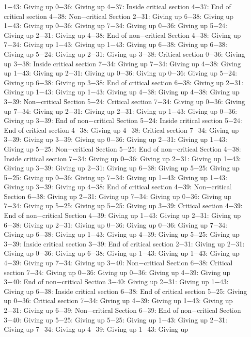 1−43: Giving up
0−36: Giving up
4−37: Inside critical section
4−37: End of critical section
4−38: Non−critical Section
2−31: Giving up
6−38: Giving up
1−43: Giving up
0−36: Giving up
7−34: Giving up
0−36: Giving up
5−24: Giving up
2−31: Giving up
4−38: End of non−critical Section
4−38: Giving up
7−34: Giving up
1−43: Giving up
1−43: Giving up
6−38: Giving up
6−38: Giving up
5−24: Giving up
2−31: Giving up
3−38: Critical section
0−36: Giving up
3−38: Inside critical section
7−34: Giving up
7−34: Giving up
4−38: Giving up
1−43: Giving up
2−31: Giving up
0−36: Giving up
0−36: Giving up
5−24: Giving up
6−38: Giving up
3−38: End of critical section
6−38: Giving up
2−31: Giving up
1−43: Giving up
1−43: Giving up
4−38: Giving up
4−38: Giving up
3−39: Non−critical Section
5−24: Critical section
7−34: Giving up
0−36: Giving up
7−34: Giving up
2−31: Giving up
2−31: Giving up
1−43: Giving up
0−36: Giving up
3−39: End of non−critical Section
5−24: Inside critical section
5−24: End of critical section
4−38: Giving up
4−38: Critical section
7−34: Giving up
3−39: Giving up
3−39: Giving up
0−36: Giving up
2−31: Giving up
1−43: Giving up
5−25: Non−critical Section
5−25: End of non−critical Section
4−38: Inside critical section
7−34: Giving up
0−36: Giving up
2−31: Giving up
1−43: Giving up
3−39: Giving up
2−31: Giving up
6−38: Giving up
5−25: Giving up
5−25: Giving up
0−36: Giving up
7−34: Giving up
1−43: Giving up
1−43: Giving up
3−39: Giving up
4−38: End of critical section
4−39: Non−critical Section
6−38: Giving up
2−31: Giving up
7−34: Giving up
0−36: Giving up
7−34: Giving up
5−25: Giving up
5−25: Giving up
3−39: Critical section
4−39: End of non−critical Section
4−39: Giving up
1−43: Giving up
2−31: Giving up
6−38: Giving up
2−31: Giving up
0−36: Giving up
0−36: Giving up
7−34: Giving up
6−38: Giving up
1−43: Giving up
4−39: Giving up
5−25: Giving up
3−39: Inside critical section
3−39: End of critical section
2−31: Giving up
2−31: Giving up
0−36: Giving up
6−38: Giving up
1−43: Giving up
1−43: Giving up
4−39: Giving up
7−34: Giving up
3−40: Non−critical Section
6−38: Critical section
7−34: Giving up
0−36: Giving up
0−36: Giving up
4−39: Giving up
3−40: End of non−critical Section
3−40: Giving up
2−31: Giving up
1−43: Giving up
6−38: Inside critical section
6−38: End of critical section
5−25: Giving up
0−36: Critical section
7−34: Giving up
4−39: Giving up
1−43: Giving up
2−31: Giving up
6−39: Non−critical Section
6−39: End of non−critical Section
3−40: Giving up
5−25: Giving up
5−25: Giving up
1−43: Giving up
2−31: Giving up
7−34: Giving up
4−39: Giving up
1−43: Giving up
